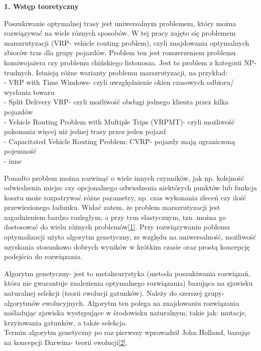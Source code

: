 \documentclass[a4paper, twoside, 12pt]{article}
\begin{document}
		
	\begin{large}\textbf{1. Wstęp teoretyczny}\end{large}
	\vspace{10mm} %
	
	\hspace{5mm}
	Poszukiwanie optymalnej trasy jest uniwersalnym problemem, który można rozwiązywać na wiele róznych sposobów. W tej pracy zajęto się problemem marszrutyzacji (VRP- vehicle routing problem), czyli znajdowania optymalnych zbiorów tras dla grupy pojazdów. Problem ten jest rozszerzeniem problemu komiwojażera czy problemu chińskiego listonosza. Jest to problem z kategorii NP- trudnych. Istnieją różne warianty problemu marszrutyzacji, na przykład:\\ 
	- VRP with Time Windows- czyli uwzględnienie okien czasowych odbioru/ wysłania towaru\\
	- Split Delivery VRP- czyli możliwość obsługi jednego klienta przez kilka pojazdów\\
	- Vehicle Routing Problem with Multiple Trips (VRPMT)- czyli możliwość pokonania więcej niż jednej trasy przez jeden pojazd\\
	- Capacitated Vehicle Routing Problem: CVRP- pojazdy mają ograniczoną pojemność\\ 
	- inne\\

	\vspace{5mm} %

	\hspace{5mm}Ponadto problem można rozwinąć o wiele innych czynników, jak np. kolejność odwiedzenia miejsc czy opcjonalnego odwiedzenia niektórych punktów lub funkcja kosztu może rozpatrywać różne parametry, np. czas wykonania zleceń czy ilość przewiezionego ładunku. Widać zatem, że problem marszrutyzacji jest zagadnieniem bardzo rozległym, a przy tym elastycznym, tzn. można go dostosować do wielu różnych problemów\hyperlink{vrp}{[1]}. Przy rozwiązywaniu poblemu optymalizacji użyto algorytm genetyczny, ze względu na uniwersalność, możliwość uzyskania stosunkowo dobrych wyników w krótkim czasie oraz prostą koncepcję podejścia do rozwiązania.
	
	\vspace{5mm} %
	
	\hspace{5mm}Algorytm genetyczny- jest to metaheurystyka (metoda poszukiwania rozwiązań, która nie gwarantuje znalezienia optymalnego rozwiązania) bazująca na zjawisku naturalnej selekcji (teorii ewolucji gatunków). Należy do szerszej grupy- algorytmów ewolucyjnych. Algorytm ten polega na znajdowaniu rozwiązania naśladując zjawiska występujące w środowisku naturalnym, takie jak: mutacje, krzyżowania gatunków, a także selekcja. \\
	Termin algorytm genetyczny po raz pierwszy wprowadził John Holland, bazując na koncepcji Darwina- teorii ewolucji\hyperlink{ag}{[2]}.
	
\end{document}
